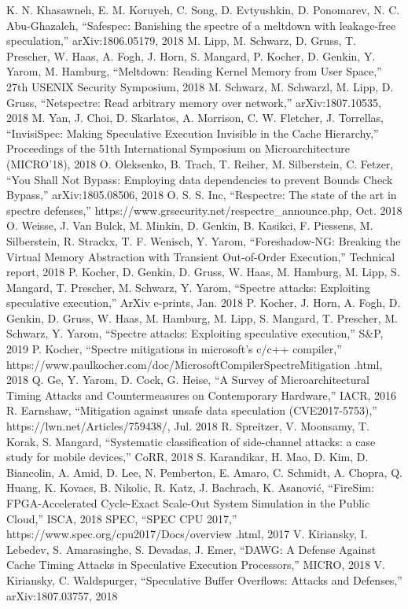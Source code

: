 \begin{thebibliography}{00}
     K. N. Khasawneh, E. M. Koruyeh, C. Song, D. Evtyushkin, D. Ponomarev, N. C. Abu-Ghazaleh, ``Safespec: Banishing the spectre of a meltdown with leakage-free speculation,'' arXiv:1806.05179, 2018
     M. Lipp, M. Schwarz, D. Gruss, T. Prescher, W. Haas, A. Fogh, J. Horn, S. Mangard, P. Kocher, D. Genkin, Y. Yarom, M. Hamburg, ``Meltdown: Reading Kernel Memory from User Space,'' 27th USENIX Security Symposium, 2018
     M. Schwarz, M. Schwarzl, M. Lipp, D. Gruss, ``Netspectre: Read arbitrary memory over network,'' arXiv:1807.10535, 2018
     M. Yan, J. Choi, D. Skarlatos, A. Morrison, C. W. Fletcher, J. Torrellas, ``InvisiSpec: Making Speculative Execution Invisible in the Cache Hierarchy,'' Proceedings of the 51th International Symposium on Microarchitecture (MICRO’18), 2018
     O. Oleksenko, B. Trach, T. Reiher, M. Silberstein, C. Fetzer, ``You Shall Not Bypass: Employing data dependencies to prevent Bounds Check Bypass,'' arXiv:1805.08506, 2018
     O. S. S. Inc, ``Respectre: The state of the art in spectre defenses,'' https://www.grsecurity.net/respectre\_announce.php, Oct. 2018
     O. Weisse, J. Van Bulck, M. Minkin, D. Genkin, B. Kasikci, F. Piessens, M. Silberstein, R. Strackx, T. F. Wenisch, Y. Yarom, ``Foreshadow-NG: Breaking the Virtual Memory Abstraction with Transient Out-of-Order Execution,'' Technical report, 2018
     P. Kocher, D. Genkin, D. Gruss, W. Haas, M. Hamburg, M. Lipp, S. Mangard, T. Prescher, M. Schwarz, Y. Yarom, ``Spectre attacks: Exploiting speculative execution,'' ArXiv e-prints, Jan. 2018
     P. Kocher, J. Horn, A. Fogh, D. Genkin, D. Gruss, W. Haas, M. Hamburg, M. Lipp, S. Mangard, T. Prescher, M. Schwarz, Y. Yarom, ``Spectre attacks: Exploiting speculative execution,'' S\&P, 2019
     P. Kocher, ``Spectre mitigations in microsoft’s c/c++ compiler,'' https://www.paulkocher.com/doc/MicrosoftCompilerSpectreMitigation .html, 2018
     Q. Ge, Y. Yarom, D. Cock, G. Heise, ``A Survey of Microarchitectural Timing Attacks and Countermeasures on Contemporary Hardware,'' IACR, 2016
     R. Earnshaw, ``Mitigation against unsafe data speculation (CVE2017-5753),'' https://lwn.net/Articles/759438/, Jul. 2018
     R. Spreitzer, V. Moonsamy, T. Korak, S. Mangard, ``Systematic classification of side-channel attacks: a case study for mobile devices,'' CoRR, 2018
     S. Karandikar, H. Mao, D. Kim, D. Biancolin, A. Amid, D. Lee, N. Pemberton, E. Amaro, C. Schmidt, A. Chopra, Q. Huang, K. Kovacs, B. Nikolic, R. Katz, J. Bachrach, K. Asanović, ``FireSim: FPGA-Accelerated Cycle-Exact Scale-Out System Simulation in the Public Cloud,'' ISCA, 2018
     SPEC, ``SPEC CPU 2017,'' https://www.spec.org/cpu2017/Docs/overview .html, 2017
     V. Kiriansky, I. Lebedev, S. Amarasinghe, S. Devadas, J. Emer, ``DAWG: A Defense Against Cache Timing Attacks in Speculative Execution Processors,'' MICRO, 2018
     V. Kiriansky, C. Waldspurger, ``Speculative Buffer Overflows: Attacks and Defenses,'' arXiv:1807.03757, 2018
\end{thebibliography}

